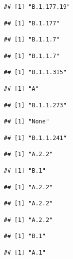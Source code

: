 \documentclass[]{article}
\begin{document}
\begin{verbatim}
## [1] "B.1.177.19"
\end{verbatim}

\begin{verbatim}
## [1] "B.1.177"
\end{verbatim}

\begin{verbatim}
## [1] "B.1.1.7"
\end{verbatim}

\begin{verbatim}
## [1] "B.1.1.7"
\end{verbatim}

\begin{verbatim}
## [1] "B.1.1.315"
\end{verbatim}

\begin{verbatim}
## [1] "A"
\end{verbatim}

\begin{verbatim}
## [1] "B.1.1.273"
\end{verbatim}

\begin{verbatim}
## [1] "None"
\end{verbatim}

\begin{verbatim}
## [1] "B.1.1.241"
\end{verbatim}

\begin{verbatim}
## [1] "A.2.2"
\end{verbatim}

\begin{verbatim}
## [1] "B.1"
\end{verbatim}

\begin{verbatim}
## [1] "A.2.2"
\end{verbatim}

\begin{verbatim}
## [1] "A.2.2"
\end{verbatim}

\begin{verbatim}
## [1] "A.2.2"
\end{verbatim}

\begin{verbatim}
## [1] "B.1"
\end{verbatim}

\begin{verbatim}
## [1] "A.1"
\end{verbatim}
\end{document}
